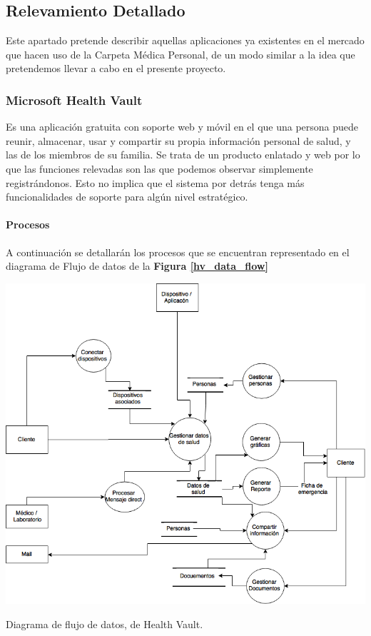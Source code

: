 \clearpage
\subsection{Relevamiento Detallado}
Este apartado pretende describir aquellas aplicaciones ya existentes en el mercado que hacen uso de la Carpeta Médica Personal, de un modo similar a la idea que pretendemos llevar a cabo en el presente proyecto.


\subsubsection{Microsoft Health Vault}
	 Es una aplicación gratuita con soporte web y móvil en el que una persona puede reunir, almacenar, usar y compartir su propia información personal de salud, y las de los miembros de su familia. Se trata de un producto enlatado y web por lo que las funciones relevadas son las que podemos observar simplemente registrándonos.
     Esto no implica que el sistema por detrás tenga más funcionalidades de soporte para algún nivel estratégico.
{\correccionTexto	
\paragraph{Procesos}


A continuación se detallarán los procesos que se encuentran representado en el diagrama de Flujo de datos de la \textbf{Figura \ref{hv_data_flow}}
}
	\begin{correccionFigure}[h]
      \centering
      \includegraphics[width=.8\textwidth]{img/tp1/hv_flujo_de_datos}
      \caption{Diagrama de flujo de datos, de Health Vault.}
      \label{hv_data_flow}
    \end{correccionFigure} 


